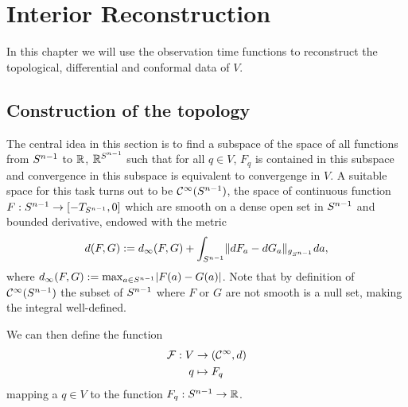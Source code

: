 \chapter{Interior Reconstruction}\label{chap:interior}
In this chapter we will use the observation time functions to reconstruct the topological, differential and conformal data of $V$.

\section{Construction of the topology}
The central idea in this section is to find a subspace of the space of all functions from ${S^{n-1}}$ to $\mathbb{R}$, $\mathbb{R}^{S^{n-1}}$ such that for all $q\in V$, $F_q$ is contained in this subspace and convergence in this subspace is equivalent to convergenge in $V$.
A suitable space for this task turns out to be ${\mathcal{C}}^\infty({S^{n-1}})$, the space of continuous function $F:{S^{n-1}}\to [-T_{S^{n-1}},0]$ which are smooth on a dense open set in ${S^{n-1}}$ and bounded derivative, endowed with the metric
\[
    d(F,G):= d_\infty(F,G) + \int_{{S^{n-1}}} \lVert dF_a - dG_a \rVert_{g_{S^{n-1}}}da,
\] where $d_\infty(F,G):=\max_{a\in {S^{n-1}}}\lvert F(a)-G(a)\rvert$.
Note that by definition of ${\mathcal{C}}^\infty({S^{n-1}})$ the subset of ${S^{n-1}}$ where $F$ or $G$ are not smooth is a null set, making the integral well-defined.

We can then define the function 
\begin{align*}
    \mathcal{F}:V &\to ({\mathcal{C}}^\infty, d)\\
    q&\mapsto F_q
\end{align*} mapping a $q\in V$ to the function $F_q:{S^{n-1}}\to\mathbb{R}$. 

